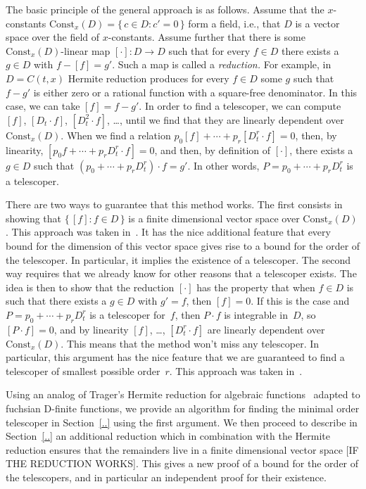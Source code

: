 \documentclass{sig-alternate}
\begin{document}
The basic principle of the general approach is as follows. Assume that the
$x$-constants $\mathrm{Const}_x(D)=\{\,c\in D:c'=0\,\}$ form a field, i.e., that $D$
is a vector space over the field of $x$-constants. Assume further that there is
some $\mathrm{Const}_x(D)$-linear map $[\cdot]\colon D\to D$ such that for every
$f\in D$ there exists a $g\in D$ with $f-[f]=g'$. Such a map is called a
\emph{reduction.} For example, in $D=C(t,x)$ Hermite reduction produces for
every $f\in D$ some $g$ such that $f-g'$ is either zero or a rational function
with a square-free denominator. In this case, we can take $[f]=f-g'$.
In order to find a telescoper, we can compute $[f]$, $[D_t\cdot f]$, $[D_t^2\cdot f]$, \dots,
until we find that they are linearly dependent over $\mathrm{Const}_x(D)$.
When we find a relation
$p_0[f] + \cdots + p_r[D_t^r\cdot f] = 0$,
then, by linearity,
$[p_0 f + \cdots + p_r D_t^r\cdot f] = 0$,
and then, by definition of $[\cdot]$, there exists a $g\in D$ such that $(p_0+\cdots + p_rD_t^r)\cdot f=g'$.
In other words, $P=p_0+\cdots + p_rD_t^r$ is a telescoper.

There are two ways to guarantee that this method works. The first consists in
showing that $\{\,[f]:f\in D\,\}$ is a finite dimensional vector space over
$\mathrm{Const}_x(D)$. This approach was taken in~\cite{..,..,..}. It has the
nice additional feature that every bound for the dimension of this vector space
gives rise to a bound for the order of the telescoper. In particular, it implies
the existence of a telescoper. The second way requires that we already know for
other reasons that a telescoper exists. The idea is then to show that the
reduction $[\cdot]$ has the property that when $f\in D$ is such that there
exists a $g\in D$ with $g'=f$, then $[f]=0$. If this is the case and
$P=p_0+\cdots+p_rD_t^r$ is a telescoper for~$f$, then $P\cdot f$ is integrable
in~$D$, so $[P\cdot f]=0$, and by linearity $[f]$, \dots, $[D_t^r\cdot f]$ are
linearly dependent over $\mathrm{Const}_x(D)$. This means that the method won't
miss any telescoper. In particular, this argument has the nice feature that we
are guaranteed to find a telescoper of smallest possible order~$r$. This
approach was taken in~\cite{..}.

Using an analog of Trager's Hermite reduction for algebraic
functions~\cite{..,..}  adapted to fuchsian D-finite functions, we provide an
algorithm for finding the minimal order telescoper in Section~\ref{..} using the
first argument. We then proceed to describe in Section~\ref{..} an additional
reduction which in combination with the Hermite reduction ensures that the
remainders live in a finite dimensional vector space [IF THE REDUCTION
WORKS]. This gives a new proof of a bound for the order of the telescopers,
and in particular an independent proof for their existence.
\end{document}
